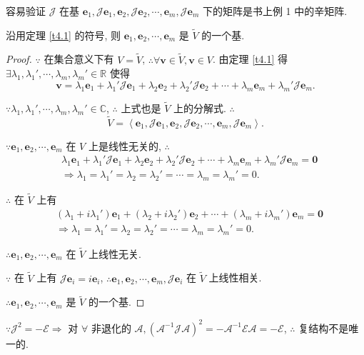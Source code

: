 \documentclass[color=black,device=normal,lang=cn,mode=geye]{elegantnote}
\begin{document}
容易验证 $\mathcal{J}$ 在基 $\boldsymbol{e}_1,\mathcal{J}\boldsymbol{e}_1,\boldsymbol{e}_2,\mathcal{J}\boldsymbol{e}_2,\cdots,\boldsymbol{e}_m,\mathcal{J}\boldsymbol{e}_m$ 下的矩阵是书上例 1 中的辛矩阵.
\begin{theorem}
    沿用定理 \ref{t4.1} 的符号, 则 $\boldsymbol{e}_1,\boldsymbol{e}_2,\cdots,\boldsymbol{e}_m$ 是 $\widetilde{V}$ 的一个基.
\end{theorem}
\begin{proof}
    $\because$ 在集合意义下有 $V=\widetilde{V}$, $\therefore\forall\boldsymbol{v}\in\widetilde{V},\boldsymbol{v}\in V$. 由定理 \ref{t4.1} 得 $\exists\lambda_1,\lambda_1',\cdots,\lambda_m,\lambda_m'\in\mathbb{R}$ 使得
    \[\boldsymbol{v}=\lambda_1\boldsymbol{e}_1+\lambda_1'\mathcal{J}\boldsymbol{e}_1+\lambda_2\boldsymbol{e}_2+\lambda_2'\mathcal{J}\boldsymbol{e}_2+\cdots+\lambda_m\boldsymbol{e}_m+\lambda_m'\mathcal{J}\boldsymbol{e}_m.\]

    $\because\lambda_1,\lambda_1',\cdots,\lambda_m,\lambda_m'\in\mathbb{C}$, $\therefore$ 上式也是 $\widetilde{V}$ 上的分解式. $\therefore$
    \[\widetilde{V}=\left<\boldsymbol{e}_1,\mathcal{J}\boldsymbol{e}_1,\boldsymbol{e}_2,\mathcal{J}\boldsymbol{e}_2,\cdots,\boldsymbol{e}_m,\mathcal{J}\boldsymbol{e}_m\right>.\]

    $\because\boldsymbol{e}_1,\boldsymbol{e}_2,\cdots,\boldsymbol{e}_m$ 在 $V$ 上是线性无关的, $\therefore$
    \begin{align*}
        & \lambda_1\boldsymbol{e}_1+\lambda_1'\mathcal{J}\boldsymbol{e}_1+\lambda_2\boldsymbol{e}_2+\lambda_2'\mathcal{J}\boldsymbol{e}_2+\cdots+\lambda_m\boldsymbol{e}_m+\lambda_m'\mathcal{J}\boldsymbol{e}_m=\boldsymbol{0} \\
        & \Rightarrow\lambda_1=\lambda_1'=\lambda_2=\lambda_2'=\cdots=\lambda_m=\lambda_m'=0.
    \end{align*}

    $\therefore$ 在 $\widetilde{V}$ 上有
    \begin{align*}
        & (\lambda_1+i\lambda_1')\boldsymbol{e}_1+(\lambda_2+i\lambda_2')\boldsymbol{e}_2+\cdots+(\lambda_m+i\lambda_m')\boldsymbol{e}_m=\boldsymbol{0} \\
        & \Rightarrow\lambda_1=\lambda_1'=\lambda_2=\lambda_2'=\cdots=\lambda_m=\lambda_m'=0.
    \end{align*}

    $\therefore\boldsymbol{e}_1,\boldsymbol{e}_2,\cdots,\boldsymbol{e}_m$ 在 $\widetilde{V}$ 上线性无关.

    $\because$ 在 $\widetilde{V}$ 上有 $\mathcal{J}\boldsymbol{e}_i=i\boldsymbol{e}_i$, $\therefore\boldsymbol{e}_1,\boldsymbol{e}_2,\cdots,\boldsymbol{e}_m,\mathcal{J}\boldsymbol{e}_i$ 在 $\widetilde{V}$ 上线性相关.

    $\therefore\boldsymbol{e}_1,\boldsymbol{e}_2,\cdots,\boldsymbol{e}_m$ 是 $\widetilde{V}$ 的一个基.
\end{proof}
$\because\mathcal{J}^2=-\mathcal{E}\Rightarrow$ 对 $\forall$ 非退化的 $\mathcal{A},(\mathcal{A}^{-1}\mathcal{J}\mathcal{A})^2=-\mathcal{A}^{-1}\mathcal{E}\mathcal{A}=-\mathcal{E}$, $\therefore$ 复结构不是唯一的.
\end{document}
